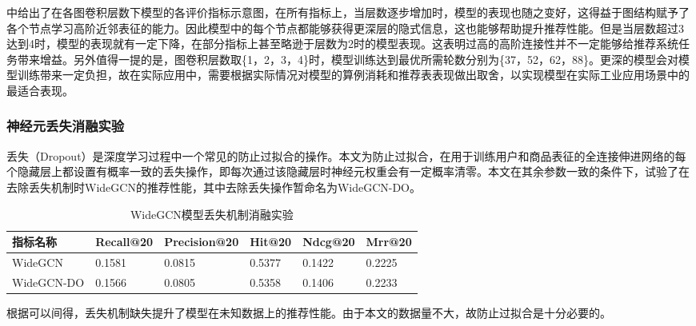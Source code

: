 \documentclass[lang=cn,11pt,a4paper,cite=authoryear]{elegantpaper}
\begin{document}
中给出了在各图卷积层数下模型的各评价指标示意图，在所有指标上，当层数逐步增加时，模型的表现也随之变好，这得益于图结构赋予了各个节点学习高阶近邻表征的能力。因此模型中的每个节点都能够获得更深层的隐式信息，这也能够帮助提升推荐性能。但是当层数超过3达到4时，模型的表现就有一定下降，在部分指标上甚至略逊于层数为2时的模型表现。这表明过高的高阶连接性并不一定能够给推荐系统任务带来增益。另外值得一提的是，图卷积层数取\{1，2，3，4\}时，模型训练达到最优所需轮数分别为\{37，52，62，88\}。更深的模型会对模型训练带来一定负担，故在实际应用中，需要根据实际情况对模型的算例消耗和推荐表表现做出取舍，以实现模型在实际工业应用场景中的最适合表现。

\subsubsection{神经元丢失消融实验}
丢失（Dropout）是深度学习过程中一个常见的防止过拟合的操作。本文为防止过拟合，在用于训练用户和商品表征的全连接伸进网络的每个隐藏层上都设置有概率一致的丢失操作，即每次通过该隐藏层时神经元权重会有一定概率清零。本文在其余参数一致的条件下，试验了在去除丢失机制时WideGCN的推荐性能，其中去除丢失操作暂命名为WideGCN-DO。
\begin{table}[!htb]
  \centering
  \caption{WideGCN模型丢失机制消融实验}
    \huge
    \begin{tabular}{C{2.5cm}|C{1.9cm}|C{1.9cm}|C{1.9cm}|C{1.9cm}|C{1.9cm}}
    \hline
    \textbf{指标名称} & \textbf{Recall@20} & \textbf{Precision@20} & \textbf{Hit@20} & \textbf{Ndcg@20} & \textbf{Mrr@20} \\
    \hline
    WideGCN & 0.1581 & 0.0815 & 0.5377 & 0.1422 & 0.2225 \\
    WideGCN-DO & 0.1566 & 0.0805 & 0.5358 & 0.1406 & 0.2233 \\
    \hline
    \end{tabular}
  \label{Dropout消融实验}
\end{table}

根据可以间得，丢失机制缺失提升了模型在未知数据上的推荐性能。由于本文的数据量不大，故防止过拟合是十分必要的。
\end{document}
